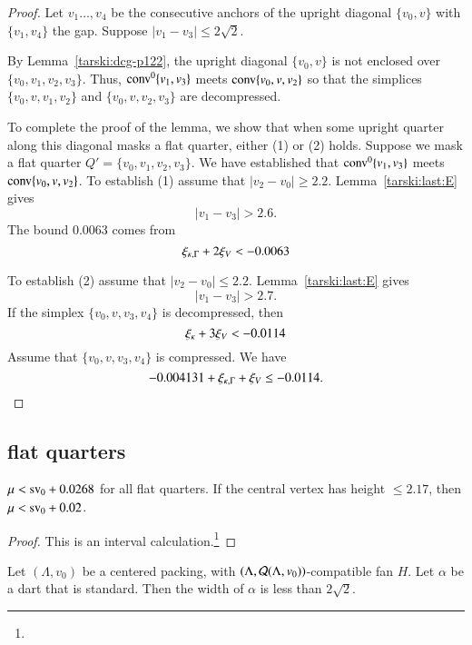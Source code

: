 \begin{proof}
\smallskip
Let $v_1\ldots,v_4$ be the consecutive anchors of
the upright diagonal $\{v_0,v\}$ with $\{v_1,v_4\}$ the gap.
Suppose $|v_1-v_3|\le 2\sqrt{2}$.

By Lemma~\ref{tarski:dcg-p122}, 
the upright diagonal $\{v_0,v\}$ is not enclosed over
$\{v_0,v_1,v_2,v_3\}$.   
Thus, ${\operatorname{conv}}^0\{v_1,v_3\}$ meets ${\operatorname{conv}}\{v_0,v,v_2\}$ so that the
simplices $\{v_0,v,v_1,v_2\}$
and $\{v_0,v,v_2,v_3\}$ are decompressed.

To complete the proof of the lemma, we show that when
some upright quarter along this diagonal masks a flat quarter, 
 either (1) or (2) holds.
Suppose we mask a flat quarter $Q'=\{v_0,v_1,v_2,v_3\}$.
We have established that ${\operatorname{conv}}^0\{v_1,v_3\}$ meets 
${\operatorname{conv}}\{v_0,v,v_2\}$.
To establish (1) assume that $|v_2-v_0|\ge 2.2$.  Lemma~\ref{tarski:last:E} 
gives
    $$|v_1-v_3|>2.6.$$
The bound $0.0063$ comes from
    $$\xi_{\kappa,\Gamma} + 2\xi_V < -0.0063$$

To establish (2) assume that $|v_2-v_0|\le 2.2$. Lemma~\ref{tarski:last:E} gives
    $$|v_1-v_3|>2.7.$$
  If the simplex
$\{v_0,v,v_3,v_4\}$ is decompressed, then $$\xi_\kappa + 3\xi_V  < -0.0114$$
Assume that $\{v_0,v,v_3,v_4\}$ is compressed. We have
    $$-0.004131 +\xi_{\kappa,\Gamma} + \xi_V \le -0.0114.$$
\end{proof}

\subsection{flat quarters} %



\begin{lemma}
$\mu < {\operatorname{sv}}_0 +0.0268$ for all flat quarters. If the central
vertex has height $\le2.17$, then $\mu<{\operatorname{sv}}_0+0.02$.
\end{lemma}

\begin{proof}
This is an interval calculation.\footnote{} %
\end{proof}




\begin{lemma}\label{lemma:1.32}
Let $(\Lambda,v_0)$ be a centered packing, 
with $(\Lambda,{\mathcal Q}(\Lambda,v_0))$-compatible fan $H$.
Let $\alpha$ be a dart that
is standard.
Then the width of $\alpha$ is less than $2\sqrt2$.
\end{lemma}



